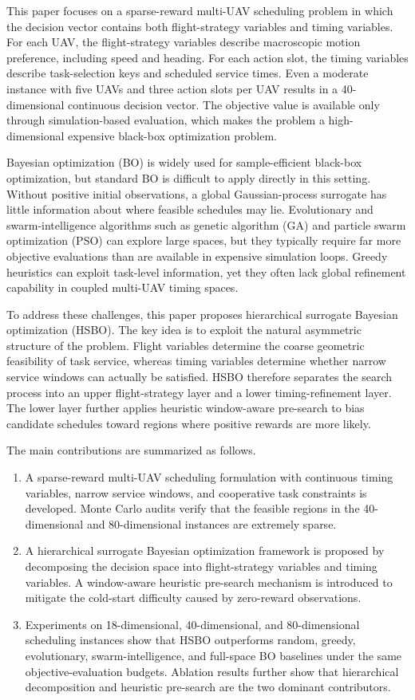 \documentclass[twocolumn]{article}
\begin{document}
This paper focuses on a sparse-reward multi-UAV scheduling problem in which the decision vector contains both flight-strategy variables and timing variables. For each UAV, the flight-strategy variables describe macroscopic motion preference, including speed and heading. For each action slot, the timing variables describe task-selection keys and scheduled service times. Even a moderate instance with five UAVs and three action slots per UAV results in a 40-dimensional continuous decision vector. The objective value is available only through simulation-based evaluation, which makes the problem a high-dimensional expensive black-box optimization problem.

Bayesian optimization (BO) is widely used for sample-efficient black-box optimization, but standard BO is difficult to apply directly in this setting. Without positive initial observations, a global Gaussian-process surrogate has little information about where feasible schedules may lie. Evolutionary and swarm-intelligence algorithms such as genetic algorithm (GA) and particle swarm optimization (PSO) can explore large spaces, but they typically require far more objective evaluations than are available in expensive simulation loops. Greedy heuristics can exploit task-level information, yet they often lack global refinement capability in coupled multi-UAV timing spaces.

To address these challenges, this paper proposes hierarchical surrogate Bayesian optimization (HSBO). The key idea is to exploit the natural asymmetric structure of the problem. Flight variables determine the coarse geometric feasibility of task service, whereas timing variables determine whether narrow service windows can actually be satisfied. HSBO therefore separates the search process into an upper flight-strategy layer and a lower timing-refinement layer. The lower layer further applies heuristic window-aware pre-search to bias candidate schedules toward regions where positive rewards are more likely.

The main contributions are summarized as follows.
\begin{enumerate}[leftmargin=1.2em]
    \item A sparse-reward multi-UAV scheduling formulation with continuous timing variables, narrow service windows, and cooperative task constraints is developed. Monte Carlo audits verify that the feasible regions in the 40-dimensional and 80-dimensional instances are extremely sparse.
    \item A hierarchical surrogate Bayesian optimization framework is proposed by decomposing the decision space into flight-strategy variables and timing variables. A window-aware heuristic pre-search mechanism is introduced to mitigate the cold-start difficulty caused by zero-reward observations.
    \item Experiments on 18-dimensional, 40-dimensional, and 80-dimensional scheduling instances show that HSBO outperforms random, greedy, evolutionary, swarm-intelligence, and full-space BO baselines under the same objective-evaluation budgets. Ablation results further show that hierarchical decomposition and heuristic pre-search are the two dominant contributors.
\end{enumerate}
\end{document}
